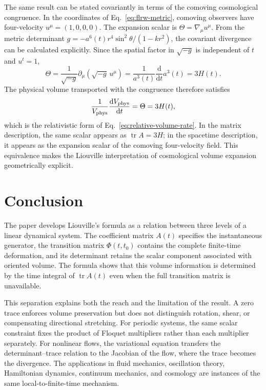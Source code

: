 \documentclass[11pt,a4paper]{article}
\newcommand{\be}{\begin{equation}}
\newcommand{\ee}{\end{equation}}
\newcommand{\lb}[1]{\label{#1}}
\newcommand{\dd}{\mathrm{d}}
\DeclareMathOperator{\tr}{tr}
\theoremstyle{definition}
\numberwithin{equation}{section}
\begin{document}
The same result can be stated covariantly in terms of the comoving cosmological congruence. In the coordinates of Eq.~\eqref{eq:flrw-metric}, comoving observers have four-velocity $u^\mu=(1,0,0,0)$. The expansion scalar is $\Theta=\nabla_\mu u^\mu$. From the metric determinant $g=-a^6(t)r^4\sin^2\theta/(1-kr^2)$, the covariant divergence can be calculated explicitly. Since the spatial factor in $\sqrt{-g}$ is independent of $t$ and $u^t=1$,
\be
\Theta
=\frac{1}{\sqrt{-g}}\partial_\mu(\sqrt{-g}\,u^\mu)
=\frac{1}{a^3(t)}\frac{\dd}{\dd t}a^3(t)
=3H(t).
\lb{eq:flrw-expansion-scalar}
\ee
The physical volume transported with the congruence therefore satisfies
\be
\frac{1}{V_{\rm phys}}\frac{\dd V_{\rm phys}}{\dd t}=\Theta=3H(t),
\lb{eq:flrw-covariant-volume}
\ee
which is the relativistic form of Eq.~\eqref{eq:relative-volume-rate}. In the matrix description, the same scalar appears as $\tr A=3H$; in the spacetime description, it appears as the expansion scalar of the comoving four-velocity field. This equivalence makes the Liouville interpretation of cosmological volume expansion geometrically explicit. \cite{weinberg2008,mukhanov2005}



\section{Conclusion}

The paper develops Liouville's formula as a relation between three levels of a linear dynamical system. The coefficient matrix $A(t)$ specifies the instantaneous generator, the transition matrix $\Phi(t,t_0)$ contains the complete finite-time deformation, and its determinant retains the scalar component associated with oriented volume. The formula shows that this volume information is determined by the time integral of $\tr A(t)$ even when the full transition matrix is unavailable.

This separation explains both the reach and the limitation of the result. A zero trace enforces volume preservation but does not distinguish rotation, shear, or compensating directional stretching. For periodic systems, the same scalar constraint fixes the product of Floquet multipliers rather than each multiplier separately. For nonlinear flows, the variational equation transfers the determinant--trace relation to the Jacobian of the flow, where the trace becomes the divergence. The applications in fluid mechanics, oscillation theory, Hamiltonian dynamics, continuum mechanics, and cosmology are instances of the same local-to-finite-time mechanism.
\end{document}
